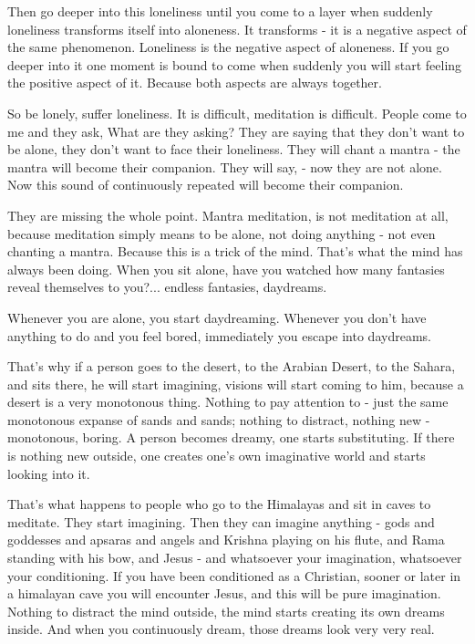Then go deeper into this loneliness until you come to a layer when suddenly loneliness transforms itself into aloneness. It transforms - it is a negative aspect of the same phenomenon. Loneliness is the negative aspect of aloneness. If you go deeper into it one moment is bound to come when suddenly you will start feeling the positive aspect of it. Because both aspects are always together. 

So be lonely, suffer loneliness. It is difficult, meditation is difficult. People come to me and they ask,  What are they asking? They are saying that they don't want to be alone, they don't want to face their loneliness. They will chant a mantra - the mantra will become their companion. They will say,  - now they are not alone. Now this sound of  continuously repeated will become their companion. 

They are missing the whole point. Mantra meditation, is not meditation at all, because meditation simply means to be alone, not doing anything - not even chanting a mantra. Because this is a trick of the mind. That's what the mind has always been doing. When you sit alone, have you watched how many fantasies reveal themselves to you?... endless fantasies, daydreams. 

Whenever you are alone, you start daydreaming. Whenever you don't have anything to do and you feel bored, immediately you escape into daydreams. 

That's why if a person goes to the desert, to the Arabian Desert, to the Sahara, and sits there, he will start imagining, visions will start coming to him, because a desert is a very monotonous thing. Nothing to pay attention to - just the same monotonous expanse of sands and sands; nothing to distract, nothing new - monotonous, boring. A person becomes dreamy, one starts substituting. If there is nothing new outside, one creates one's own imaginative world and starts looking into it. 

That's what happens to people who go to the Himalayas and sit in caves to meditate. They start imagining. Then they can imagine anything - gods and goddesses and apsaras and angels and Krishna playing on his flute, and Rama standing with his bow, and Jesus - and whatsoever your imagination, whatsoever your conditioning. If you have been conditioned as a Christian, sooner or later in a himalayan cave you will encounter Jesus, and this will be pure imagination. Nothing to distract the mind outside, the mind starts creating its own dreams inside. And when you continuously dream, those dreams look very very real. 

